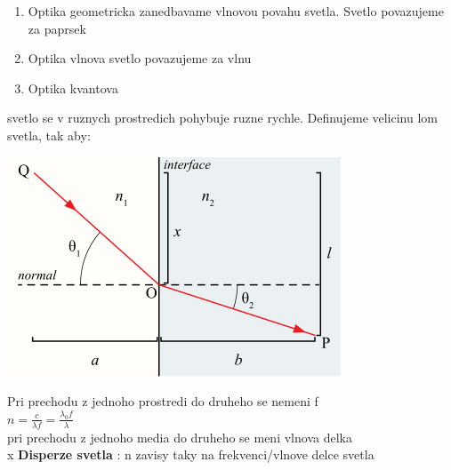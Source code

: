 \documentclass{report}
\begin{document}
\begin{enumerate}[label=\bfseries\tiny\protect\circled{\small\arabic*}]
  \item Optika geometricka zanedbavame vlnovou povahu svetla. Svetlo povazujeme za paprsek
  \item Optika vlnova svetlo povazujeme za vlnu
  \item Optika kvantova 
\end{enumerate}

svetlo se v ruznych prostredich pohybuje ruzne rychle. Definujeme velicinu lom svetla, tak aby: \\


\begin{center}
  \includegraphics[width=0.4\linewidth]{images/Snells_law.png}
\end{center}


Pri prechodu z jednoho prostredi do druheho se nemeni f \\
$n = \frac{c}{\lambda f}=\frac{\lambda_0 f}{\lambda}$ \\
pri prechodu z jednoho media do druheho se meni vlnova delka \\
x \textbf{Disperze svetla} : n zavisy taky na frekvenci/vlnove delce svetla \\
\end{document}
